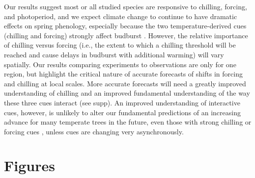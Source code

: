 \documentclass{article}
\begin{document}
\par Our results suggest most or all studied species are responsive to chilling, forcing, and photoperiod, and we expect climate change to continue to have dramatic effects on spring phenology, especially because the two temperature-derived cues (chilling and forcing) strongly affect budburst  \citep{Laube:2014a}. However, the relative importance of chilling versus forcing (i.e., the extent to which a chilling threshold will be reached and cause delays in budburst with additional warming) will vary spatially. Our results comparing experiments to observations are only for one region, but highlight the critical nature of accurate forecasts of shifts in forcing and chilling at local scales. More accurate forecasts will need a greatly improved understanding of chilling and an improved fundamental understanding of the way these three cues interact (see supp). An improved understanding of interactive cues, however, is unlikely to alter our fundamental predictions of an increasing advance for many temperate trees in the future, even those with strong chilling or forcing cues \citep{gauzere2017}, unless cues are changing very asynchronously. %


\section* {Figures}
\end{document}

